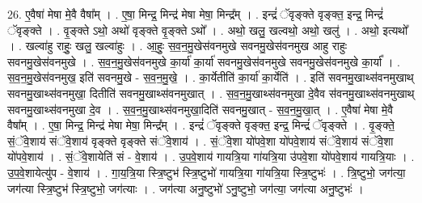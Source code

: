 \documentclass[17pt]{extarticle}
\begin{document}
26. ए॒वैषा॑ मेषा मे॒वै वैषा᳚म् । . ए॒षा॒ मिन्द्र॒ मिन्द्र॑ मेषा मेषा॒ मिन्द्र᳚म् । . इन्द्रं॑ ॅवृङ्क्ते वृङ्क्त॒ इन्द्र॒ मिन्द्रं॑ ॅवृङ्क्ते । . वृ॒ङ्क्ते ऽथो॒ अथो॑ वृङ्क्ते वृ॒ङ्क्ते ऽथो᳚ । . अथो॒ खलु॒ खल्वथो॒ अथो॒ खलु॑ । . अथो॒ इत्यथो᳚ । . खल्वा॑हु राहुः॒ खलु॒ खल्वा॑हुः । . आ॒हुः॒ स॒व॒न॒मु॒खेस॑वनमुखे सवनमु॒खेस॑वनमुख आहु राहुः सवनमु॒खेस॑वनमुखे । . स॒व॒न॒मु॒खेस॑वनमुखे का॒र्या॑ का॒र्या॑ सवनमु॒खेस॑वनमुखे सवनमु॒खेस॑वनमुखे का॒र्या᳚ । . स॒व॒न॒मु॒खेस॑वनमुख॒ इति॑ सवनमु॒खे - स॒व॒न॒मु॒खे॒ । . का॒र्येतीति॑ का॒र्या॑ का॒र्येति॑ । . इति॑ सवनमु॒खाथ्स॑वनमुखाथ् सवनमु॒खाथ्स॑वनमुखा॒ दितीति॑ सवनमु॒खाथ्स॑वनमुखात् । . स॒व॒न॒मु॒खाथ्स॑वनमुखा दे॒वैव स॑वनमु॒खाथ्स॑वनमुखाथ् सवनमु॒खाथ्स॑वनमुखा दे॒व । . स॒व॒न॒मु॒खाथ्स॑वनमुखा॒दिति॑ सवनमु॒खात् - स॒व॒न॒मु॒खा॒त् । . ए॒वैषा॑ मेषा मे॒वै वैषा᳚म् । . ए॒षा॒ मिन्द्र॒ मिन्द्र॑ मेषा मेषा॒ मिन्द्र᳚म् । . इन्द्रं॑ ॅवृङ्क्ते वृङ्क्त॒ इन्द्र॒ मिन्द्रं॑ ॅवृङ्क्ते । . वृ॒ङ्क्ते॒ सं॒ॅवे॒शाय॑ संॅवे॒शाय॑ वृङ्क्ते वृङ्क्ते संॅवे॒शाय॑ । . सं॒ॅवे॒शा यो॑पवे॒शा यो॑पवे॒शाय॑ संॅवे॒शाय॑ संॅवे॒शा यो॑पवे॒शाय॑ । . सं॒ॅवे॒शायेति॑ सं - वे॒शाय॑ । . उ॒प॒वे॒शाय॑ गायत्रि॒या गा॑यत्रि॒या उ॑पवे॒शा यो॑पवे॒शाय॑ गायत्रि॒याः । . उ॒प॒वे॒शायेत्यु॑प - वे॒शाय॑ । . गा॒य॒त्रि॒या स्त्रि॒ष्टुभ॑ स्त्रि॒ष्टुभो॑ गायत्रि॒या गा॑यत्रि॒या स्त्रि॒ष्टुभः॑ । . त्रि॒ष्टुभो॒ जग॑त्या॒ जग॑त्या स्त्रि॒ष्टुभ॑ स्त्रि॒ष्टुभो॒ जग॑त्याः । . जग॑त्या अनु॒ष्टुभो॑ ऽनु॒ष्टुभो॒ जग॑त्या॒ जग॑त्या अनु॒ष्टुभः॑ । \newline
\end{document}
